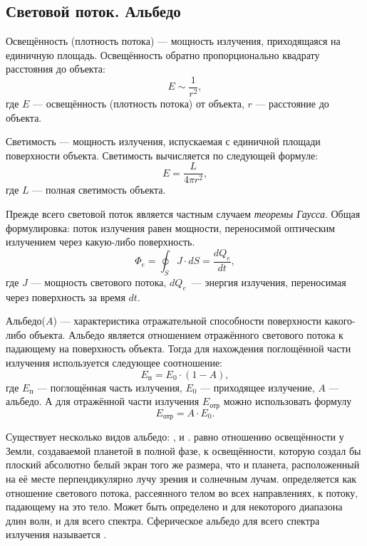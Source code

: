 \subsection{Световой поток. Альбедо}
Освещённость (плотность потока) --- мощность излучения, приходящаяся на единичную площадь. Освещённость обратно пропорционально квадрату расстояния до объекта:
\begin{equation}
E\sim \frac{1}{r^2},
\end{equation}
где $E$ --- освещённость (плотность потока) от объекта, $r$ --- расстояние до объекта.

Светимость --- мощность излучения, испускаемая с единичной площади поверхности объекта. Светимость вычисляется по следующей формуле:
\begin{equation}
E=\frac{L}{4\pi r^2},
\end{equation}
где $L$ --- полная светимость объекта.

Прежде всего световой поток является частным случаем \textit{теоремы Гаусса}. Общая формулировка:  поток излучения равен мощности, переносимой оптическим излучением через какую-либо поверхность. 
\begin{equation}
\Phi_e=\oint_SJ\cdot dS=\frac{dQ_e}{dt},
\end{equation}
где $J$ --- мощность светового потока, $dQ_e$~--- энергия излучения, переносимая через поверхность за время $dt$.


Альбедо($A$) --- характеристика отражательной способности поверхности какого-либо объекта. Альбедо является отношением отражённого светового потока к падающему на поверхность объекта. Тогда для нахождения поглощённой части излучения используется следующее соотношение:
\begin{equation}
E_{\text{п}}=E_0\cdot (1-A),
\end{equation}
где $E_{\text{п}}$ --- поглощённая часть излучения, $E_0$ --- приходящее излучение, $A$ --- альбедо. А для отражённой части излучения $E_{\text{отр}}$ можно использовать формулу
\begin{equation}
	E_{\text{отр}}=A\cdot E_0.
\end{equation}

Существует несколько видов альбедо: ,  и .  равно отношению освещённости у Земли, создаваемой планетой в полной фазе, к освещённости, которую создал бы плоский абсолютно белый экран того же размера, что и планета, расположенный на её месте перпендикулярно лучу зрения и солнечным лучам.  определяется как отношение светового потока, рассеянного телом во всех направлениях, к потоку, падающему на это тело. Может быть определено и для некоторого диапазона длин волн, и для всего спектра. Сферическое альбедо для всего спектра излучения называется .